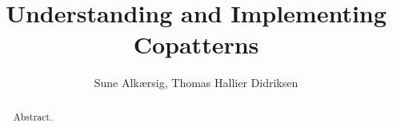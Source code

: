 \documentclass[oribibl]{llncs}
\begin{document}
\mainmatter
\title{Understanding and Implementing Copatterns}
\author{Sune Alk\ae{}rsig, Thomas Hallier Didriksen \\
}

\maketitle

\begin{abstract}
Abstract.
\end{abstract}










\end{document}
